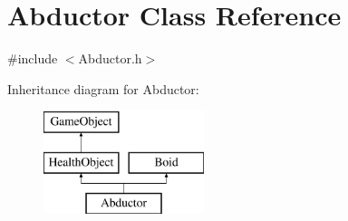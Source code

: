 \hypertarget{class_abductor}{}\section{Abductor Class Reference}
\label{class_abductor}


{\ttfamily \#include $<$Abductor.\+h$>$}

Inheritance diagram for Abductor\+:\begin{figure}[H]
\begin{center}
\leavevmode
\includegraphics[height=3.000000cm]{class_abductor}
\end{center}
\end{figure}

